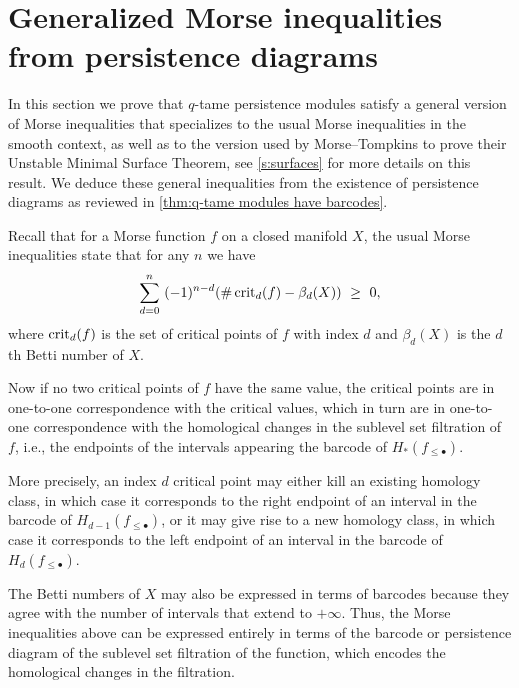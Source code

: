 
\section{Generalized Morse inequalities from persistence diagrams} \label{s:inequalities}

In this section we prove that $q$-tame persistence modules satisfy a general version of Morse inequalities that specializes to the usual Morse inequalities in the smooth context, as well as to the version used by Morse--Tompkins to prove their Unstable Minimal Surface Theorem, see \cref{s:surfaces} for more details on this result.
We deduce these general inequalities from the existence of persistence diagrams as reviewed in \cref{thm:q-tame modules have barcodes}.

Recall that for a Morse function $f$ on a closed manifold $X$, the usual Morse inequalities state that for any $n$ we have
\begin{equation}\label{equ:morse_inequalities}
    \sum_{d=0}^n \ (-1)^{n-d} ( \# \crit_{d}(f) - \beta_{d}(X) ) \ \geq\  0,  
\end{equation}
where $\operatorname{crit}_{d}(f)$ is the set of critical points of $f$ with index $d$ and $\beta_{d}(X)$ is the $d$th Betti number of $X$. 

Now if no two critical points of $f$ have the same value, the critical points are in one-to-one correspondence with the critical values, which in turn are in one-to-one correspondence with the homological changes in the sublevel set filtration of $f$, i.e., the endpoints of the intervals appearing the barcode of $H_*(f_{\leq \bullet})$. 

More precisely, an index $d$ critical point may either kill an existing homology class, in which case it corresponds to the right endpoint of an interval in the barcode of $H_{d-1}(f_{\leq \bullet})$, or it may give rise to a new homology class, in which case it corresponds to the left endpoint of an interval in the barcode of $H_d(f_{\leq \bullet})$.

The Betti numbers of $X$ may also be expressed in terms of barcodes because they agree with the number of intervals that extend to $+\infty$. 
Thus, the Morse inequalities above can be expressed entirely in terms of the barcode or persistence diagram of the sublevel set filtration of the function, which encodes the homological changes in the filtration.

